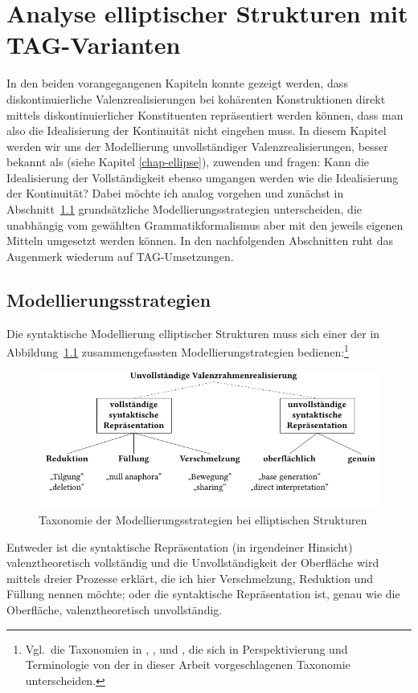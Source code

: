 \chapter{Analyse elliptischer Strukturen mit TAG-Varianten} \label{sec-ellipsenanalyse}


In den beiden vorangegangenen Kapiteln konnte gezeigt werden, dass diskontinuierliche Valenzrealisierungen bei kohärenten Konstruktionen direkt mittels diskontinuierlicher Konstituenten repräsentiert werden können, dass man also die Idealisierung der Kontinuität nicht eingehen muss. In diesem Kapitel werden wir uns der Modellierung unvollständiger Valenzrealisierungen, besser bekannt als  (siehe Kapitel \ref{chap-ellipse}), zuwenden und fragen: Kann die Idealisierung der Vollständigkeit ebenso umgangen werden wie die Idealisierung der Kontinuität? Dabei möchte ich analog vorgehen und zunächst in Abschnitt~\ref{sec-ellipsenanalyse-wege} grundsätzliche Modellierungsstrategien unterscheiden, die unabhängig vom gewählten Grammatikformalismus aber mit den jeweils eigenen Mitteln umgesetzt werden können. In den nachfolgenden Abschnitten ruht das Augenmerk wiederum auf TAG-Umsetzungen. 



\section{Modellierungsstrategien} \label{sec-ellipsenanalyse-wege}

Die syntaktische Modellierung elliptischer Strukturen muss sich einer der in Abbildung~\ref{fig-ellipse-strategien} zusammengefassten Modellierungstrategien bedienen:\footnote{Vgl.\ die Taxonomien in \citet[768f,788f]{Klein:93}, \citet[16ff]{Schwabe:94}, \citet[5]{Winkler:Schwabe:03} und \citet[2]{Aelbrecht:10}, die sich in Perspektivierung und Terminologie von der in dieser Arbeit vorgeschlagenen Taxonomie unterscheiden.}
\begin{figure}[t]
\centering
\includegraphics{graphics/abb81.pdf}
\caption{\label{fig-ellipse-strategien}Taxonomie der Modellierungsstrategien bei elliptischen Struk\-turen}
\end{figure}
Entweder ist die syntaktische Repräsentation (in irgendeiner Hinsicht) valenztheoretisch vollständig und die Unvollständigkeit der Oberfläche wird mittels dreier Prozesse erklärt, die ich hier Verschmelzung, Reduktion und Füllung nennen möchte; oder die syntaktische Repräsentation ist, genau wie die Oberfläche, valenztheoretisch unvollständig.

